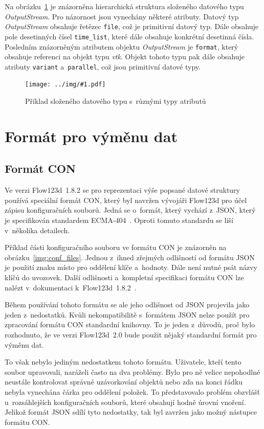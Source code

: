 \documentclass[FM,bw,DP]{tulthesis}
\newcommand{\includeimg}[2]{%
\begin{figure}[h]
	\centering
    \texttt{[image: ../img/\#1.pdf]}
    \caption{#2}
	\label{img:#1}
\end{figure}
}
\begin{document}
Na obrázku~\ref{img:data_tree} je znázorněna hierarchická struktura složeného datového typu \textit{OutputStream}. Pro názornost jsou vynechány některé atributy. Datový typ \textit{OutputStream} obsahuje řetězec \texttt{file}, což je primitivní datový typ. Dále obsahuje pole desetinných čísel \texttt{time\_list}, které dále obsahuje konkrétní desetinná čísla. Posledním znázorněným atributem objektu \textit{OutputStream} je \texttt{format}, který obsahuje referenci na objekt typu \textit{vtk}. Objekt tohoto typu pak dále obsahuje atributy \texttt{variant} a~\texttt{parallel}, což jsou primitivní datové typy.

\includeimg{data_tree}{Příklad složeného datového typu s~různými typy atributů}

\section{Formát pro výměnu dat}

\subsection{Formát CON}

Ve verzi Flow123d~1.8.2 se pro reprezentaci výše popsané datové struktury používá speciální formát \gls{CON}, který byl navržen vývojáři Flow123d pro účel zápisu konfiguračních souborů. Jedná se o~formát, který vychází z~\gls{JSON}, který je specifikován standardem ECMA-404~\cite{bib:ecma404}. Oproti tomuto standardu se liší v~několika detailech.

Příklad části konfiguračního souboru ve formátu \gls{CON} je znázorněn na obrázku~\ref{img:conf_files}. Jednou z~ihned zřejmých odlišností od formátu \gls{JSON} je použití znaku \uv{\texttt{=}} místo \uv{\texttt{:}} pro oddělení klíče a~hodnoty. Dále není nutné psát názvy klíčů do uvozovek. Další odlišnosti a~kompletní specifikaci formátu \gls{CON} lze nalézt v~dokumentaci k~Flow123d~1.8.2~\cite{bib:flow123d-manual}.

Během používání tohoto formátu se ale jeho odlišnost od \gls{JSON} projevila jako jeden z~nedostatků. Kvůli nekompatibilitě s~formátem \gls{JSON} nelze použít pro zpracování formátu \gls{CON} standardní knihovny. To je jeden z~důvodů, proč bylo rozhodnuto, že ve verzi Flow123d~2.0 bude použit nějaký standardní formát pro výměnu dat.

To však nebylo jediným nedostatkem tohoto formátu. Uživatele, kteří tento soubor upravovali, naráželi často na dva problémy. Bylo pro ně velice nepohodlné neustále kontrolovat správné uzávorkování objektů nebo zda na konci řádku nebyla vynechána čárka pro oddělení položek. To představovalo problém  obzvlášť u~rozsáhlejších konfiguračních souborů, které obsahují hodně úrovní vnoření. Jelikož formát \gls{JSON} sdílí tyto nedostatky, tak byl zavržen jako možný nástupce formátu \gls{CON}.
\end{document}
